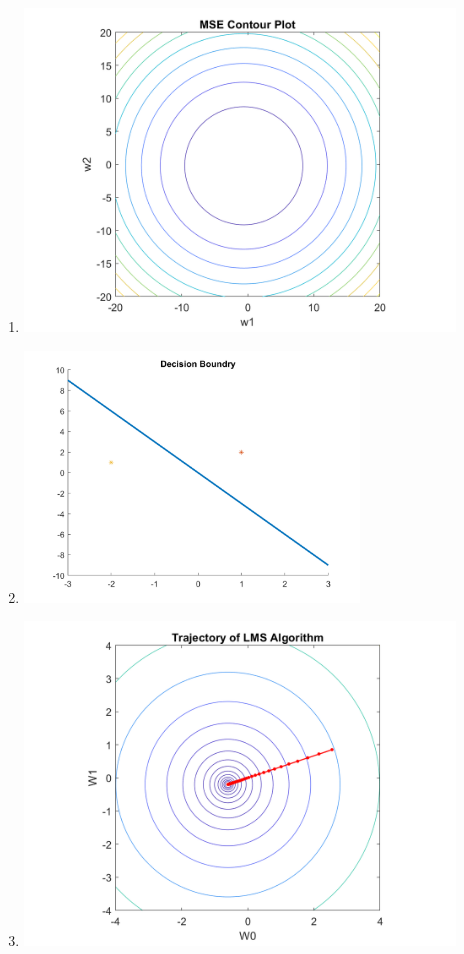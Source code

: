 \documentclass{article}
\begin{document}
\begin{enumerate} [label=\Alph*]
  \item \leavevmode \begin{center} \includegraphics[width=0.9\textwidth]{Problem9_A.png} \end{center}
  \newpage
  \item \leavevmode \begin{center} \includegraphics[width=0.7\textwidth]{Problem9_B.png} \end{center} 
  \item \leavevmode \begin{center} \includegraphics[width=0.9\textwidth]{Problem9_C.png} \end{center} 
\end{enumerate}
\end{document}
